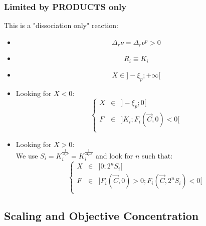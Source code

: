 \documentclass[aps,12pt]{revtex4}
\begin{document}
\subsubsection{Limited by PRODUCTS only}
This is a "dissociation only" reaction:
\begin{itemize}
\item
$$
	\Delta_r \nu =  \Delta_r \nu^p > 0 
$$
\item
$$
	R_i \equiv K_i
$$
\item
$$
	X \in \rbrack -\xi_p; +\infty \lbrack
$$
\item Looking for $X<0$:
$$
 \left\lbrace
 \begin{array}{rcl}
 	X &\in& \rbrack -\xi_p; 0 \lbrack\\
	F &\in& \rbrack K_i; F_i(\vec{C},0)<0 \lbrack\\
\end{array}
\right.
$$
\item Looking for $X>0$:\\
 We use $S_i=K_i^{\frac{1}{\Delta_r \nu}}=K_i^{\frac{1}{\Delta_r \nu^p}}$
 and look for $n$ such that:
 $$
 	\left\lbrace
 \begin{array}{rcl}
 	X &\in& \rbrack 0; 2^n S_i\lbrack\\
	F &\in& \rbrack F_i(\vec{C},0)>0; F_i(\vec{C},2^nS_i)<0 \lbrack\\
\end{array}
\right.
 $$

\end{itemize}

\subsection{Scaling and Objective Concentration}
\end{document}
